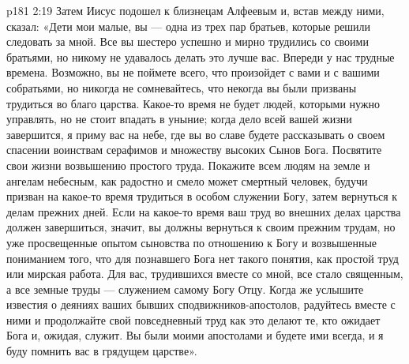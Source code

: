 \vs p181 2:19 \pc Затем Иисус подошел к близнецам Алфеевым и, встав между ними, сказал: «Дети мои малые, вы --- одна из трех пар братьев, которые решили следовать за мной. Все вы шестеро успешно и мирно трудились со своими братьями, но никому не удавалось делать это лучше вас. Впереди у нас трудные времена. Возможно, вы не поймете всего, что произойдет с вами и с вашими собратьями, но никогда не сомневайтесь, что некогда вы были призваны трудиться во благо царства. Какое\hyp{}то время не будет людей, которыми нужно управлять, но не стоит впадать в уныние; когда дело всей вашей жизни завершится, я приму вас на небе, где вы во славе будете рассказывать о своем спасении воинствам серафимов и множеству высоких Сынов Бога. Посвятите свои жизни возвышению простого труда. Покажите всем людям на земле и ангелам небесным, как радостно и смело может смертный человек, будучи призван на какое\hyp{}то время трудиться в особом служении Богу, затем вернуться к делам прежних дней. Если на какое\hyp{}то время ваш труд во внешних делах царства должен завершиться, значит, вы должны вернуться к своим прежним трудам, но уже просвещенные опытом сыновства по отношению к Богу и возвышенные пониманием того, что для познавшего Бога нет такого понятия, как простой труд или мирская работа. Для вас, трудившихся вместе со мной, все стало священным, а все земные труды --- служением самому Богу Отцу. Когда же услышите известия о деяниях ваших бывших сподвижников\hyp{}апостолов, радуйтесь вместе с ними и продолжайте свой повседневный труд как это делают те, кто ожидает Бога и, ожидая, служит. Вы были моими апостолами и будете ими всегда, и я буду помнить вас в грядущем царстве».
